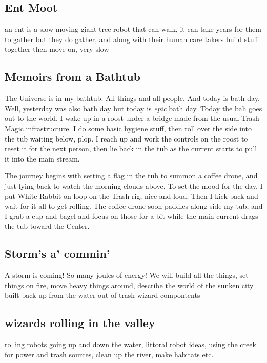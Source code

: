 \subsection{Ent Moot}\label{ent-moot}

an ent is a slow moving giant tree robot that can walk, it can take
years for them to gather but they do gather, and along with their human
care takers build stuff together then move on, very slow

\subsection{Memoirs from a Bathtub}\label{memoirs-from-a-bathtub}

The Universe is in my bathtub. All things and all people. And today is
bath day. Well, yesterday was also bath day but today is \emph{epic}
bath day. Today the bah goes out to the world. I wake up in a roost
under a bridge made from the usual Trash Magic infrastructure. I do some
basic hygiene stuff, then roll over the side into the tub waiting below,
plop. I reach up and work the controls on the roost to reset it for the
next person, then lie back in the tub as the current starts to pull it
into the main stream.

The journey begins with setting a flag in the tub to summon a coffee
drone, and just lying back to watch the morning clouds above. To set the
mood for the day, I put White Rabbit on loop on the Trash rig, nice and
loud. Then I kick back and wait for it all to get rolling. The coffee
drone soon paddles along side my tub, and I grab a cup and bagel and
focus on those for a bit while the main current drags the tub toward the
Center.

\subsection{Storm's a' commin'}\label{storms-a-commin}

A storm is coming! So many joules of energy! We will build all the
things, set things on fire, move heavy things around, describe the world
of the sunken city built back up from the water out of trash wizard
compontents

\subsection{wizards rolling in the
valley}\label{wizards-rolling-in-the-valley}

rolling robots going up and down the water, littoral robot ideas, using
the creek for power and trash sources, clean up the river, make habitats
etc.

